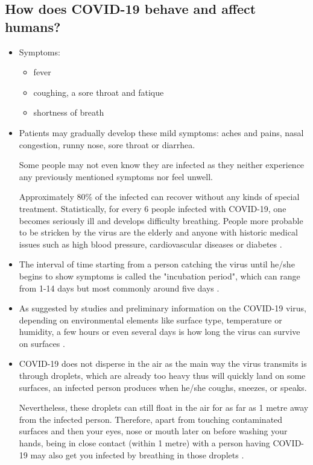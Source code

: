   \subsection{How does COVID-19 behave and affect humans?}
    \begin{itemize}
      \item Symptoms: \parencite{HealthGovAU}
        \begin{itemize}
          \item fever
          \item coughing, a sore throat and fatique
          \item shortness of breath
        \end{itemize}
      \item Patients may gradually develop these mild symptoms: aches and pains, nasal congestion, runny nose, sore throat or diarrhea.
      \par Some people may not even know they are infected as they neither experience any previously mentioned symptoms nor feel unwell.
      \par Approximately 80\% of the infected can recover without any kinds of special treatment. Statistically, for every 6 people infected with COVID-19, one becomes seriously ill and develops difficulty breathing. People more probable to be stricken by the virus are the elderly and anyone with historic medical issues such as high blood pressure, cardiovascular diseases or diabetes \parencite{Q&A_WHO}.
      \item The interval of time starting from a person catching the virus until he/she begins to show symptoms is called the "incubation period", which can range from 1-14 days but most commonly around five days \parencite{Q&A_WHO}.
      \item As suggested by studies and preliminary information on the COVID-19 virus, depending on environmental elements like surface type, temperature or humidity, a few hours or even several days is how long the virus can survive on surfaces \parencite{Q&A_WHO}.
      \item COVID-19 does not disperse in the air as the main way the virus transmits is through droplets, which are already too heavy thus will quickly land on some surfaces, an infected person produces when he/she coughs, sneezes, or speaks.
      \par Nevertheless, these droplets can still float in the air for as far as 1 metre away from the infected person. Therefore, apart from touching contaminated surfaces and then your eyes, nose or mouth later on before washing your hands, being in close contact (within 1 metre) with a person having COVID-19 may also get you infected by breathing in those droplets \parencite{Q&A_WHO}.

\end{itemize}
